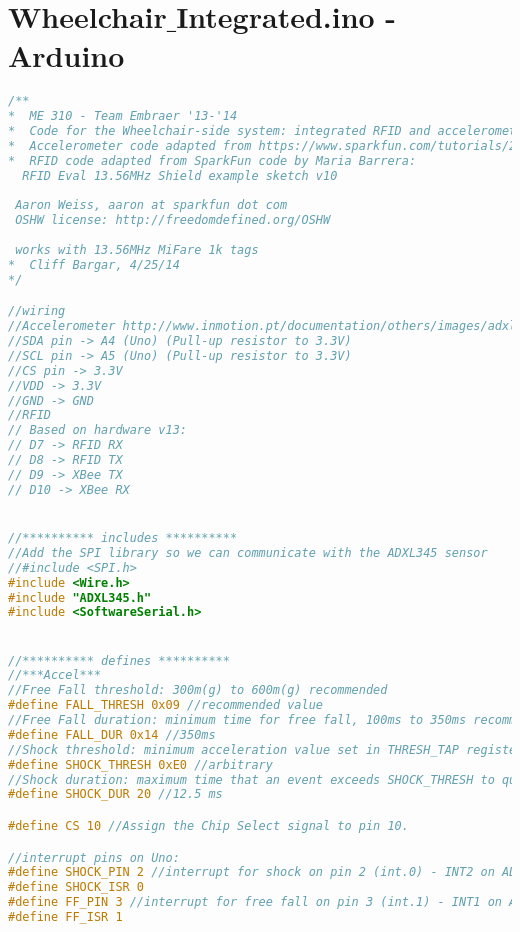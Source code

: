 \section{Wheelchair$\_$Integrated.ino - Arduino}

\begin{lstlisting}[frame = single, language = C]
/**
*  ME 310 - Team Embraer '13-'14
*  Code for the Wheelchair-side system: integrated RFID and accelerometer
*  Accelerometer code adapted from https://www.sparkfun.com/tutorials/240
*  RFID code adapted from SparkFun code by Maria Barrera:
  RFID Eval 13.56MHz Shield example sketch v10
 
 Aaron Weiss, aaron at sparkfun dot com
 OSHW license: http://freedomdefined.org/OSHW
 
 works with 13.56MHz MiFare 1k tags 
*  Cliff Bargar, 4/25/14
*/

//wiring
//Accelerometer http://www.inmotion.pt/documentation/others/images/adxl345_to_arduino_uno.png
//SDA pin -> A4 (Uno) (Pull-up resistor to 3.3V)
//SCL pin -> A5 (Uno) (Pull-up resistor to 3.3V)
//CS pin -> 3.3V
//VDD -> 3.3V
//GND -> GND
//RFID
// Based on hardware v13:
// D7 -> RFID RX
// D8 -> RFID TX
// D9 -> XBee TX
// D10 -> XBee RX


//********** includes **********
//Add the SPI library so we can communicate with the ADXL345 sensor
//#include <SPI.h>
#include <Wire.h>
#include "ADXL345.h"
#include <SoftwareSerial.h>


//********** defines **********
//***Accel***
//Free Fall threshold: 300m(g) to 600m(g) recommended
#define FALL_THRESH 0x09 //recommended value                                    <-- needs to be adjusted
//Free Fall duration: minimum time for free fall, 100ms to 350ms recommended
#define FALL_DUR 0x14 //350ms                                                  <-- needs to be adjusted
//Shock threshold: minimum acceleration value set in THRESH_TAP register, 62.5m(g)/LSB
#define SHOCK_THRESH 0xE0 //arbitrary                                           <-- needs to be adjusted
//Shock duration: maximum time that an event exceeds SHOCK_THRESH to qualify as a tap
#define SHOCK_DUR 20 //12.5 ms                                                  <-- needs to be adjusted

#define CS 10 //Assign the Chip Select signal to pin 10.

//interrupt pins on Uno:
#define SHOCK_PIN 2 //interrupt for shock on pin 2 (int.0) - INT2 on ADXL345
#define SHOCK_ISR 0
#define FF_PIN 3 //interrupt for free fall on pin 3 (int.1) - INT1 on ADXL345
#define FF_ISR 1


\end{lstlisting}
